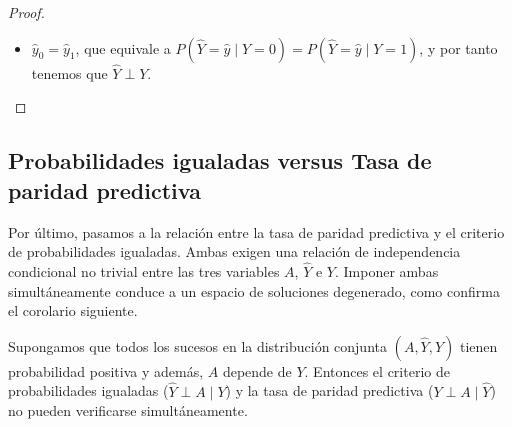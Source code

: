 \documentclass[oneside,openright,titlepage,numbers=noenddot,openany,headinclude,footinclude=true,
cleardoublepage=empty,abstractoff,BCOR=5mm,paper=a4,fontsize=12pt,main=spanish]{scrreprt}
\begin{document}
\begin{proof}
\begin{itemize}
    \item $\hat{y}_0=\hat{y}_1$, que equivale a $P(\hat{Y}=\hat{y}\mid Y=0)=P(\hat{Y}=\hat{y}\mid Y=1)$, y por tanto tenemos que $\hat{Y}\perp Y$.
\end{itemize}


\end{proof}


\subsection{Probabilidades igualadas versus Tasa de paridad predictiva}

Por último, pasamos a la relación entre la tasa de paridad predictiva y el criterio de probabilidades igualadas. Ambas exigen una relación de independencia condicional no trivial entre las tres variables $A$, $\hat{Y}$ e $Y$. Imponer ambas simultáneamente conduce a un espacio de soluciones degenerado, como confirma el corolario siguiente.\\

\begin{corollary}
Supongamos que todos los sucesos en la distribución conjunta $(A,\hat{Y},Y)$ tienen probabilidad positiva y además, $A$ depende de $Y$. Entonces el criterio de probabilidades igualadas ($\hat{Y}\perp A \mid Y$) y la tasa de paridad predictiva ($Y\perp A \mid \hat{Y}$) no pueden verificarse simultáneamente.
\label{cor:probpositiva}
\end{corollary}
\end{document}
